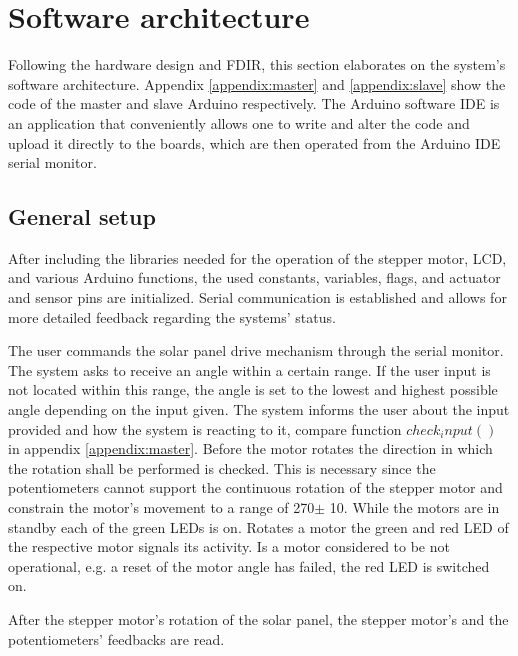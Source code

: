 \section{Software architecture}
Following the hardware design and FDIR, this section elaborates on the system's software architecture. Appendix \ref{appendix:master} and \ref{appendix:slave} show the code of the master and slave Arduino respectively. The Arduino software IDE is an application that conveniently allows one to write and alter the code and upload it directly to the boards, which are then operated from the Arduino IDE serial monitor.

\subsection{General setup}
After including the libraries needed for the operation of the stepper motor, LCD, and various Arduino functions, the used constants, variables, flags, and actuator and sensor pins are initialized. Serial communication is established and allows for more detailed feedback regarding the systems' status. 

The user commands the solar panel drive mechanism through the serial monitor. The system asks to receive an angle within a certain range. If the user input is not located within this range, the angle is set to the lowest and highest possible angle depending on the input given. The system informs the user about the input provided and how the system is reacting to it, compare function \textit{$check_input()$} in appendix \ref{appendix:master}. Before the motor rotates the direction in which the rotation shall be performed is checked. This is necessary since the potentiometers cannot support the continuous rotation of the stepper motor and constrain the motor's movement to a range of 270\degree $\pm$ 10\degree. While the motors are in standby each of the green LEDs is on. Rotates a motor the green and red LED of the respective motor signals its activity. Is a motor considered to be not operational, e.g. a reset of the motor angle has failed, the red LED is switched on. 




After the stepper motor's rotation of the solar panel, the stepper motor's and the potentiometers' feedbacks are read. 



